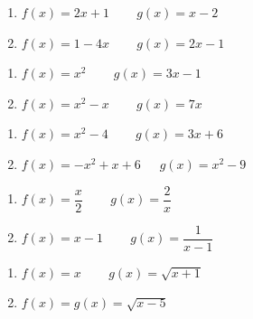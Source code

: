 \begin{multicols}{2}
\begin{enumerate}
\setcounter{enumi}{\value{HW}}

\item $f(x) = 2x+1$ ~~~ $g(x) = x-2$ \label{basicarithtwofirst}
\item $f(x) = 1-4x$ ~~~ $g(x) = 2x-1$

\setcounter{HW}{\value{enumi}}
\end{enumerate}
\end{multicols}

\begin{multicols}{2}
\begin{enumerate}
\setcounter{enumi}{\value{HW}}

\item $f(x) = x^2$ ~~~ $g(x) = 3x-1$
\item $f(x) = x^2-x$ ~~~ $g(x) = 7x$

\setcounter{HW}{\value{enumi}}
\end{enumerate}
\end{multicols}

\begin{multicols}{2}
\begin{enumerate}
\setcounter{enumi}{\value{HW}}

\item $f(x) = x^2-4$ ~~~ $g(x) = 3x+6$
\item \mbox{$f(x) = -x^2+x+6$ ~ $g(x) = x^2-9$}

\setcounter{HW}{\value{enumi}}
\end{enumerate}
\end{multicols}

\begin{multicols}{2}
\begin{enumerate}
\setcounter{enumi}{\value{HW}}

\item $f(x) = \dfrac{x}{2}$ ~~~ $g(x) = \dfrac{2}{x}$
\item $f(x) =x-1$ ~~~ $g(x) = \dfrac{1}{x-1}$

\setcounter{HW}{\value{enumi}}
\end{enumerate}
\end{multicols}

\begin{multicols}{2}
\begin{enumerate}
\setcounter{enumi}{\value{HW}}

\item $f(x) = x$ ~~~ $g(x) = \sqrt{x+1}$
\item $f(x) = g(x) = \sqrt{x-5}$ \label{basicarithtwolast}

\setcounter{HW}{\value{enumi}}
\end{enumerate}
\end{multicols}

